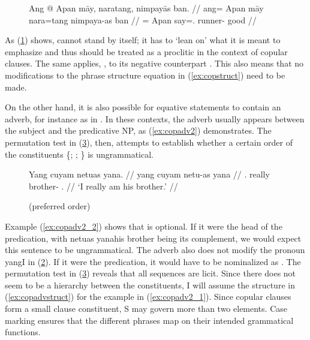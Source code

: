 \begin{figure}[h]
\ex\label{ex:copemphclit}\ljudge*\begingl
	\gla Ang @ Apan māy, naratang, nimpayās ban. //
	\glb ang= Apan māy nara=tang nimpaya-as ban //
	\glc \Aarg{}= Apan \Int{} say=\TplM{}.\Aarg{} runner-\Parg{} good //
\endgl\xe
\end{figure}

As (\ref{ex:copemphclit}) shows,  cannot stand by itself; it
has to `lean on' what it is meant to emphasize and thus should be treated as a
proclitic in the context of copular clauses. The same applies, , to its negative counterpart . This also means that
no modifications to the phrase structure equation in (\ref{ex:copstruct}) need
to be made.

On the other hand, it is also possible for equative statements to contain an
adverb, for instance as in . In these contexts, the
adverb usually appears between the subject and the predicative NP, as
(\ref{ex:copadv2}) demonstrates. The permutation test in (\ref{ex:copadvperm}),
then, attempts to establish whether a certain order of the constituents 
\{; ; \} is ungrammatical.

\begin{figure}
\pex\label{ex:copadv2}
\a\label{ex:copadv2_1}\begingl
	\gla Yang cuyam netuas yana. //
	\glb yang cuyam netu-as yana //
	\glc \Fsg{}.\Aarg{} really brother-\Parg{} \TsgM{}.\Gen{} //
	\glft `I really am his brother.' //
\endgl

\a\label{ex:copadv2_2}%

\a\label{ex:copadv2_3}\ljudge*%

\xe
\end{figure}

\begin{figure}
\pex\label{ex:copadvperm}
\a{} (preferred order)
\a{}
\a{}
\a{}
\a{}
\a{}
\xe
\end{figure}

Example (\ref{ex:copadv2_2}) shows that  is
optional. If it were the head of the predication, with 
{netuas yana}{his brother} being its complement, we would expect this sentence
to be ungrammatical. The adverb also does not modify the pronoun 
{yang}{I} in (\ref{ex:copadv2_3}). If it were the predication, it would have to
be nominalized as . The permutation test in
(\ref{ex:copadvperm}) reveals that all sequences are licit. Since there does
not seem to be a hierarchy between the constituents, I will assume the
structure in (\ref{ex:copadvstruct}) for the example in (\ref{ex:copadv2_1}).
Since copular clauses form a small clause constituent, S may govern more than
two elements. Case marking ensures that the different phrases map on their
intended grammatical functions.

